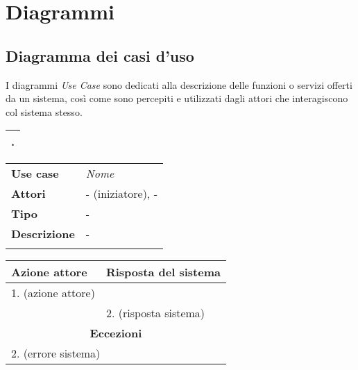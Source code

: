 \documentclass{scrreprt}
\begin{document}

\chapter{Diagrammi}

\section{Diagramma dei casi d'uso}
I diagrammi \textit{Use Case} sono dedicati alla descrizione delle
funzioni o servizi offerti da un sistema, così come sono percepiti e
utilizzati dagli attori che interagiscono col sistema stesso.

	\FloatBarrier
	\begin{table}[h|]
	\begin{tabular}{|c|}
	\hline
	{ . } \\
	\hline
	\end{tabular}
	\end{table}
	\FloatBarrier

	\FloatBarrier
	\begin{table}[h|]
	\centering
	\begin{tabular}{p{3cm}p{11cm}}
	\textbf{Use case} & \textit{Nome} \\ 
	\textbf{Attori} & - (iniziatore), - \\ 
	\textbf{Tipo} & - \\ 
	\textbf{Descrizione} & - \\
	\\
	\end{tabular}
	\centering
	\begin{tabular}{|p{7cm}|p{7cm}|}
	\hline
	\textbf{Azione attore} & \textbf{Risposta del sistema} \\ \hline
	1. (azione attore) &                  \\ \hline
	& 2. (risposta sistema) \\ \hline
	\multicolumn{2}{|c|}{\textbf{Eccezioni}} \\ \hline
	\multicolumn{2}{|l|}{ 2. (errore sistema) } \\ \hline
	\end{tabular}
	\end{table}
	\FloatBarrier

\end{document}
